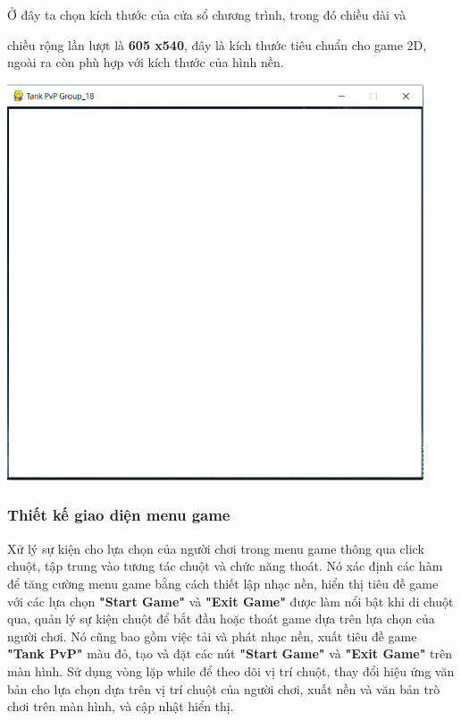 \documentclass[a4paper]{article}
\begin{document}
Ở đây ta chọn kích thước của cửa sổ chương trình, trong đó chiều dài và

chiều rộng lần lượt là \textbf{605 x540}, đây là kích thước tiêu chuẩn
cho game 2D, ngoài ra còn phù hợp với kích thước của hình nền.

\includegraphics[width=4.85278in,height=4.61667in]{image28.png}

\subsubsection{Thiết kế giao diện menu game}
Xử lý sự kiện cho lựa chọn của người chơi trong menu game thông qua click chuột, tập trung vào tương tác chuột và chức năng thoát. Nó xác định các hàm để tăng cường menu game bằng cách thiết lập nhạc nền, hiển thị tiêu đề game với các lựa chọn \textbf{"Start Game"} và \textbf{"Exit Game"} được làm nổi bật khi di chuột qua, quản lý sự kiện chuột để bắt đầu hoặc thoát game dựa trên lựa chọn của người chơi. Nó cũng bao gồm việc tải và phát nhạc nền, xuất tiêu đề game \textbf{"Tank PvP"} màu đỏ, tạo và đặt các nút \textbf{"Start} \textbf{Game"} và \textbf{"Exit Game"} trên màn hình. Sử dụng vòng lặp
while để theo dõi vị trí chuột, thay đổi hiệu ứng văn bản cho lựa chọn
dựa trên vị trí chuột của người chơi, xuất nền và văn bản trò chơi trên
màn hình, và cập nhật hiển thị.
\end{document}
